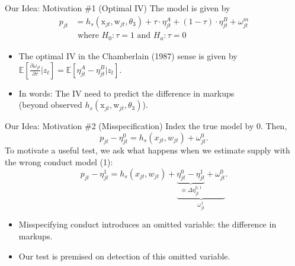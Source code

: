 \documentclass[aspectratio=169,10pt]{beamer}
\begin{document}
\begin{frame}[plain,label=innovation]{Our Idea: Motivation \#1 (Optimal IV)}
The model is given by
\begin{align*}
p_{jt} &= h_s(\textrm{x}_{jt},\textrm{w}_{jt},\theta_3) + \tau \cdot \eta^A_{jt} + (1-\tau) \cdot \eta^B_{jt} + \omega^m_{jt}\\
& \text{  where  }  H_0: \tau=1 \text{ and } H_a: \tau = 0
\end{align*}

\begin{itemize}
\item The optimal IV in the Chamberlain (1987) sense is given by $\mathbb{E}\left[\frac{\partial \omega_{jt}}{\partial \tau}|z_{t} \right]= \mathbb{E}\left[\eta^A_{jt}-\eta_{jt}^B|z_{t}\right]$.
\item In words: The IV need to predict the \alert{difference in markups}\\ (beyond observed $h_s(\textrm{x}_{jt},\textrm{w}_{jt},\theta_3)$).
\end{itemize}
\end{frame}




\begin{frame}[plain,label=misspecification]{Our Idea: Motivation \#2 (Misspecification)}
Index the \alert{true} model by $0$. Then,
$$ p_{jt} -\eta^0_{jt}= h_s(x_{jt},w_{jt}) + \omega^0_{jt}.$$
To motivate a useful test, we ask what happens when we estimate supply with the \alert{wrong} conduct model (1):
\pause
$$p_{jt} -\eta_{jt}^1 = h_s(x_{jt},w_{jt}) + \underbrace{\underbrace{\eta^0_{jt} - \eta^1_{jt}}_{\equiv \Delta \eta_{jt}^{0,1}} +  \omega_{jt}^{0}}_{\omega_{jt}^{1}}.$$
\begin{itemize}
\item Misspecifying conduct introduces an omitted variable: the difference in markups.
\item Our test is premised on detection of this omitted variable.
\end{itemize}
\end{frame}
\end{document}
